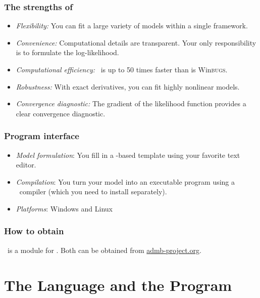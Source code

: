 \documentclass{admbmanual}
\newcommand{\scWinBUGS}{Win\textsc{bugs}}
\begin{document}
\subsection{The strengths of \scAR}

\begin{itemize}
\item \textit{Flexibility:} You can fit a large variety of models within a single framework.
\item \textit{Convenience:} Computational details are transparent. Your only
responsibility is to formulate the log-likelihood.
\item \textit{Computational efficiency:} \scAR\ is up to 50 times faster
than is \scWinBUGS.
\item \textit{Robustness:} With exact derivatives, you can fit highly nonlinear models.
\item \textit{Convergence diagnostic:} The gradient of the likelihood
function provides a clear convergence diagnostic.
\end{itemize}


\subsection{Program interface}

\begin{itemize}
\item\textit{Model formulation}: You fill in a \cplus-based template
using your favorite text editor.

\item \textit{Compilation}: You turn your model into an executable program using
a  \cplus\ compiler (which you need to install separately).

\item\textit{Platforms}: Windows and Linux
\end{itemize}


\subsection{How to obtain \scAR}

\scAR\ is a module for \scAB. Both can be obtained from
\href{admb-project.org}{admb-project.org}.



\chapter{The Language and the Program}
\end{document}
